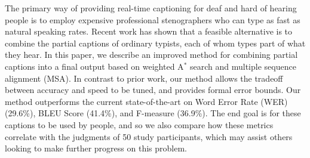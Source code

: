 The primary way of providing real-time captioning for deaf and hard of hearing people is to employ expensive professional stenographers who can type as fast
 as natural speaking rates. Recent work has shown that a feasible alternative is
 to combine the partial captions of ordinary typists, each of whom types part of
 what they hear. In this paper, we describe an improved method for combining
 partial captions into a final output based on weighted A$^*$ search and multiple
 sequence alignment (MSA). In contrast to prior work, our method allows the
 tradeoff between accuracy and speed to be tuned, and provides formal error
 bounds. Our method outperforms the current state-of-the-art on Word Error Rate
 (WER) (29.6\%), BLEU Score (41.4\%), and F-measure (36.9\%). The end goal is for
 these captions to be used by people, and so we also compare how these metrics
 correlate with the judgments of 50 study participants, which may assist others
 looking to make further progress on this problem.

